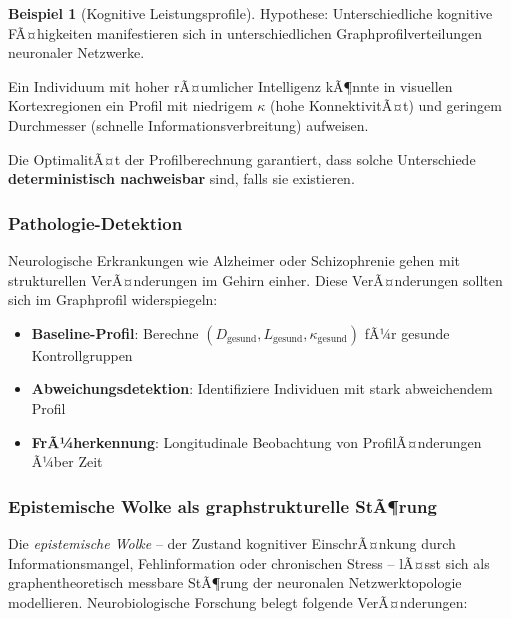 ﻿\documentclass[a4paper,12pt]{article}
\theoremstyle{definition}
\newtheorem{beispiel}{Beispiel}
\begin{document}
	\begin{beispiel}[Kognitive Leistungsprofile]
		Hypothese: Unterschiedliche kognitive FÃ¤higkei\-ten manifestieren sich in unterschiedlichen Graphprofilverteilungen neuronaler Netzwerke. 
		
		Ein Individuum mit hoher rÃ¤umlicher Intelligenz kÃ¶nnte in visuellen Kortexregionen ein Profil mit niedrigem $\kappa$ (hohe KonnektivitÃ¤t) und geringem Durchmesser (schnelle Informationsverbreitung) aufweisen.
		
		Die OptimalitÃ¤t der Profilberechnung garantiert, dass solche Unterschiede \textbf{deterministisch nachweisbar} sind, falls sie existieren.
	\end{beispiel}
	
	\subsubsection{Pathologie-Detektion}
	
	Neurologische Erkrankungen wie Alzheimer oder Schizophrenie gehen mit strukturellen VerÃ¤nderungen im Gehirn einher. Diese VerÃ¤nderungen sollten sich im Graphprofil widerspiegeln:
	
	\begin{itemize}
		\item[-] \textbf{Baseline-Profil}: Berechne $(D_{\text{gesund}}, L_{\text{gesund}}, \kappa_{\text{gesund}})$ fÃ¼r gesunde Kontrollgruppen
		\item[-] \textbf{Abweichungsdetektion}: Identifiziere Individuen mit stark abweichendem Profil
		\item[-] \textbf{FrÃ¼herkennung}: Longitudinale Beobachtung von ProfilÃ¤nderungen Ã¼ber Zeit
	\end{itemize}

	\subsubsection{Epistemische Wolke als graphstrukturelle StÃ¶rung}

	Die \emph{epistemische Wolke} -- der Zustand kognitiver EinschrÃ¤nkung durch Informationsmangel, Fehlinformation oder chronischen Stress -- lÃ¤sst sich als graphentheoretisch messbare StÃ¶rung der neuronalen Netzwerktopologie modellieren. Neurobiologische Forschung belegt folgende VerÃ¤nderungen:
\end{document}
